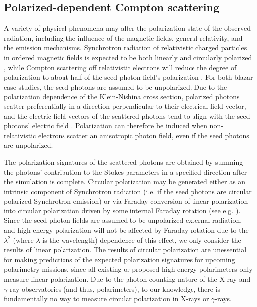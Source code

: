 \documentclass[twocolumn, tighten, twocolappendix]{aastex63}
\begin{document}
\subsection{Polarized-dependent Compton scattering}
A variety of physical phenomena may alter the polarization state of the observed radiation, including the influence of the magnetic fields, general relativity, and the emission mechanisms. Synchrotron radiation of relativistic charged particles in ordered magnetic fields is expected to be both linearly and circularly polarized \citep{Westfold_1959, RybickiandLightman_1979}, while Compton scattering off relativistic electrons will reduce the degree of polarization to about half of the seed photon field's polarization \citep{Bonometto_etal1970}. For both blazar case studies, the seed photons are assumed to be unpolarized. Due to the polarization dependence of the Klein-Nishina cross section, polarized photons scatter preferentially in a direction perpendicular to their electrical field vector, and the electric field vectors of the scattered photons tend to align with the seed photons' electric field \citep{Matt_etal1996}. Polarization can therefore be induced when non-relativistic electrons scatter an anisotropic photon field, even if the seed photons are unpolarized.

The polarization signatures of the scattered photons are obtained by summing the photons' contribution to the Stokes parameters in a specified direction after the simulation is complete. Circular polarization may be generated either as an intrinsic component of Synchrotron radiation (i.e. if the seed photons are circular polarized Synchrotron emission) or via Faraday conversion of linear polarization into circular polarization driven by some internal Faraday rotation (see e.g. \cite{Wardle_etal1998, Homan_etal2009, MacDonald_Marscher_2018, Boehm_etal2019}). Since the seed photon fields are assumed to be unpolarized external radiation, and high-energy polarization
will not be affected by Faraday rotation due to the $\lambda^2$ (where $\lambda$ is the wavelength) dependence of this effect, we only consider the results of linear polarization. The results of circular polarization are unessential for making predictions of the expected polarization signatures for upcoming polarimetry missions, since all existing or proposed high-energy polarimeters only measure linear polarization. Due to the photon-counting nature of the X-ray and $\gamma$-ray observatories (and thus, polarimeters), to our knowledge, there is fundamentally no way to measure circular polarization in X-rays or $\gamma$-rays.
\end{document}
